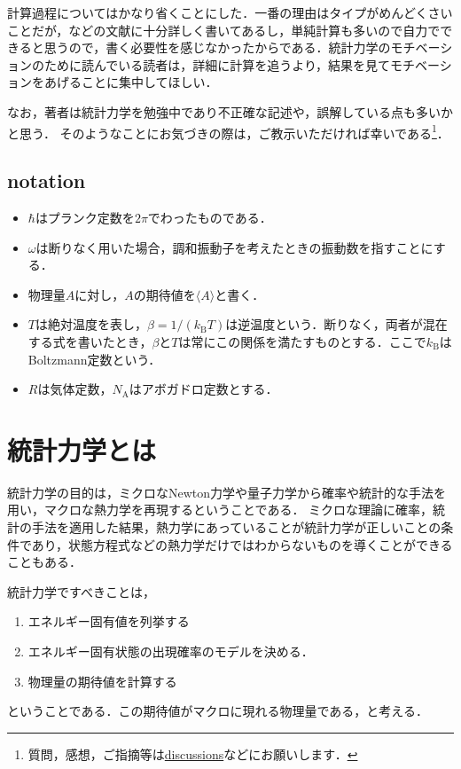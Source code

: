 \documentclass[dvipdfmx, a4paper]{jsarticle}
\theoremstyle{break}
\numberwithin{equation}{section}
\begin{document}
	計算過程についてはかなり省くことにした．一番の理由はタイプがめんどくさいことだが，\cite{Tasaki_statmech}などの文献に十分詳しく書いてあるし，単純計算も多いので自力でできると思うので，書く必要性を感じなかったからである．統計力学のモチベーションのために読んでいる読者は，詳細に計算を追うより，結果を見てモチベーションをあげることに集中してほしい．

    なお，著者は統計力学を勉強中であり不正確な記述や，誤解している点も多いかと思う．
    そのようなことにお気づきの際は，ご教示いただければ幸いである\footnote{質問，感想，ご指摘等は\href{https://github.com/toshitnk/hp/discussions/4}{discussions}などにお願いします．}．
	\subsection{notation}
	\begin{itemize}
			\item $\hbar$はプランク定数を$2\pi$でわったものである．
			\item $\omega$は断りなく用いた場合，調和振動子を考えたときの振動数を指すことにする．
			\item 物理量$A$に対し，$A$の期待値を$\langle A \rangle$と書く．
			\item $T$は絶対温度を表し，$\beta = 1/(k_{\text{B}}T)$は逆温度という．断りなく，両者が混在する式を書いたとき，$\beta$と$T$は常にこの関係を満たすものとする．ここで$k_{\text{B}}$はBoltzmann定数という．
			\item $R$は気体定数，$N_{\text{A}}$はアボガドロ定数とする．
	\end{itemize}

	\section{統計力学とは}\label{sec:motivation}

	統計力学の目的は，ミクロなNewton力学や量子力学から確率や統計的な手法を用い，マクロな熱力学を再現するということである．
	ミクロな理論に確率，統計の手法を適用した結果，熱力学にあっていることが統計力学が正しいことの条件であり，状態方程式などの熱力学だけではわからないものを導くことができることもある．

	統計力学ですべきことは，
	\begin{enumerate}
			\item エネルギー固有値を列挙する
			\item エネルギー固有状態の出現確率のモデルを決める．
			\item 物理量の期待値を計算する
	\end{enumerate}
	ということである．この期待値がマクロに現れる物理量である，と考える．
\end{document}
